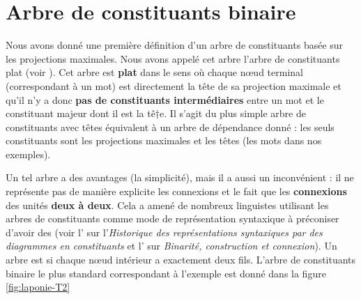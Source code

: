 \section{Arbre de constituants binaire}\label{sec:3.4.14}

Nous avons donné une première définition d’un arbre de constituants basée sur les projections maximales. Nous avons appelé cet arbre l’arbre de constituants plat (voir ). Cet arbre est \textbf{plat} dans le sens où chaque nœud terminal (correspondant à un mot) est directement la tête de sa projection maximale et qu’il n’y a donc \textbf{pas de constituants intermédiaires} entre un mot et le constituant majeur dont il est la tê†e. Il s’agit du plus simple arbre de constituants avec têtes équivalent à un arbre de dépendance donné : les seuls constituants sont les projections maximales et les têtes (les mots dans nos exemples).

Un tel arbre a des avantages (la simplicité), mais il a aussi un inconvénient : il ne représente pas de manière explicite les connexions et le fait que les \textbf{connexions} des unités \textbf{deux à deux}. Cela a amené de nombreux linguistes utilisant les arbres de constituants comme mode de représentation syntaxique à préconiser d’avoir des  (voir l' sur l’\textit{Historique des représentations syntaxiques par des diagrammes en constituants} et l' sur \textit{Binarité, construction et connexion}). Un arbre est  si chaque nœud intérieur a exactement deux fils. L’arbre de constituants binaire le plus standard correspondant à l'exemple  est donné dans la figure \ref{fig:laponie-T2}

